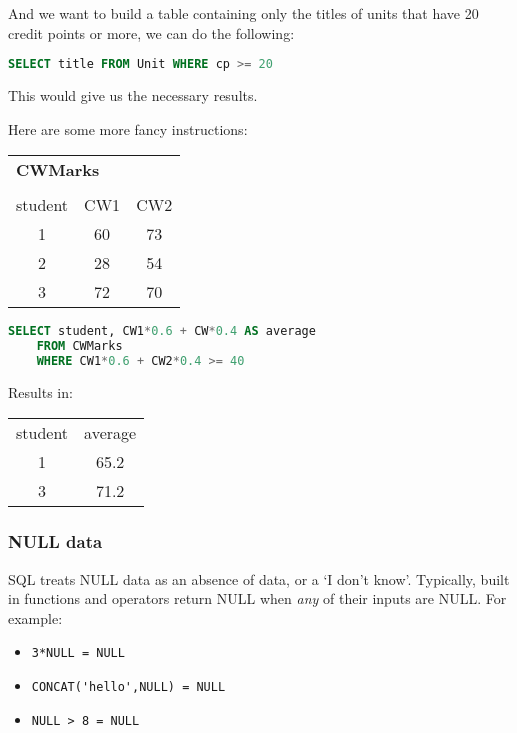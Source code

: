 \documentclass[11pt,a4paper,titlepage,dvipsnames,cmyk]{scrartcl}
\begin{document}
And we want to build a table containing only the titles of units that have
20 credit points or more, we can do the following:

\begin{lstlisting}[language=SQL]
SELECT title FROM Unit WHERE cp >= 20
\end{lstlisting}

This would give us the necessary results.

\begin{minipage}{\textwidth}
Here are some more fancy instructions: 

\begin{center}
    \begin{tabular}{c|c|c}
        \multicolumn{3}{l}{\textbf{CWMarks}} \\
        \multicolumn{3}{c}{}
        \\
        student & CW1 & CW2 \\ \hhline{=|=|=}
        1 & 60 & 73 \\
        2 & 28 & 54 \\
        3 & 72 & 70
    \end{tabular}
\end{center}

\begin{lstlisting}[language=SQL]
SELECT student, CW1*0.6 + CW*0.4 AS average
    FROM CWMarks
    WHERE CW1*0.6 + CW2*0.4 >= 40
\end{lstlisting}
\end{minipage}

Results in:

\begin{center}
    \begin{tabular}{c|c}
        student & average \\ \hhline{=|=}
        1 & 65.2 \\
        3 & 71.2
    \end{tabular}
\end{center}

\subsubsection{NULL data}%
\label{ssub:NULL}

SQL treats NULL data as an absence of data, or a `I don't know'.
Typically, built in functions and operators return NULL when \textit{any}
of their inputs are NULL. For example:

\begin{itemize}
    \item \lstinline{3*NULL = NULL}
    \item \lstinline{CONCAT('hello',NULL) = NULL} 
    \item \lstinline{NULL > 8 = NULL} 
\end{itemize}
\end{document}
